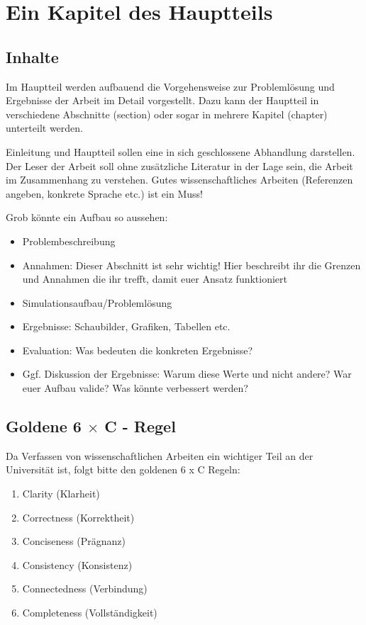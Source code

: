 \chapter{Ein Kapitel des Hauptteils}
\label{chap:body}

\section{Inhalte}
Im Hauptteil werden aufbauend die Vorgehensweise zur Problemlösung und 
Ergebnisse der Arbeit im Detail vorgestellt.
Dazu kann der Hauptteil in verschiedene Abschnitte 
(section) oder sogar in mehrere Kapitel (chapter) unterteilt werden.

Einleitung und Hauptteil sollen eine in sich geschlossene Abhandlung
darstellen. Der Leser der Arbeit soll ohne zusätzliche Literatur in
der Lage sein, die Arbeit im Zusammenhang zu verstehen.
Gutes wissenschaftliches Arbeiten (Referenzen angeben, konkrete Sprache etc.) ist ein Muss!

Grob könnte ein Aufbau so aussehen:
\begin{itemize}
	\item Problembeschreibung
	\item Annahmen: Dieser Abschnitt ist sehr wichtig! Hier beschreibt ihr die Grenzen und Annahmen die ihr trefft, damit euer Ansatz funktioniert
	\item Simulationsaufbau/Problemlösung
	\item Ergebnisse: Schaubilder, Grafiken, Tabellen etc.
	\item Evaluation: Was bedeuten die konkreten Ergebnisse?
	\item Ggf. Diskussion der Ergebnisse: Warum diese Werte und nicht andere? War euer Aufbau valide? Was könnte verbessert werden?
\end{itemize}



\section{Goldene 6 \texorpdfstring{$\times$}{x} C - Regel}
Da Verfassen von wissenschaftlichen Arbeiten ein wichtiger Teil an der Universität ist, folgt bitte den goldenen 6 x C Regeln:


\begin{enumerate}
	\item Clarity (Klarheit)
	\item Correctness (Korrektheit)
	\item Conciseness (Prägnanz)
	\item Consistency (Konsistenz)
	\item Connectedness (Verbindung)
	\item Completeness (Vollständigkeit)
\end{enumerate}

